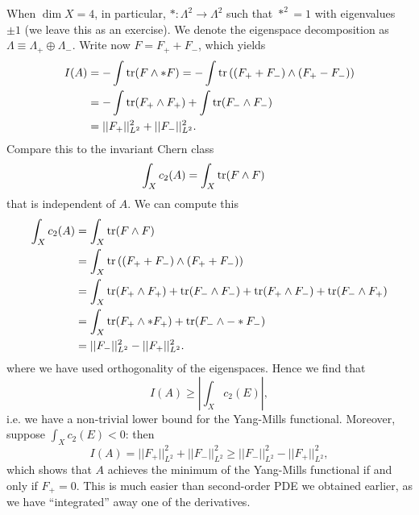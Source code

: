 \documentclass{../mathnotes}
\begin{document}
When $\dim X=4$, in particular, $*:\Lambda^2\to\Lambda^2$ such that $*^2=1$ with eigenvalues $\pm 1$
(we leave this as an exercise). We denote the eigenspace decomposition as $\Lambda\equiv\Lambda_+\oplus\Lambda_-$.
Write now $F=F_++F_-$, which yields
\begin{align*}
    I(A)&=-\int\operatorname{tr}(F\wedge *F)=-\int\operatorname{tr}\left( (F_++F_-)\wedge (F_+-F_-) \right)\\
    &=-\int\operatorname{tr}(F_+\wedge F_+)+\int\operatorname{tr}(F_-\wedge F_-)\\
    &=||F_+||^2_{L^2}+||F_-||^2_{L^2}.
\end{align*}
Compare this to the invariant Chern class
\begin{align*}
    \int_Xc_2(A)&=\int_X\operatorname{tr}(F\wedge F)
\end{align*}
that is independent of $A$. We can compute this
\begin{align*}
    \int_Xc_2(A)&=\int_X\operatorname{tr}(F\wedge F)\\
    &=\int_X\operatorname{tr}\left( (F_++F_-)\wedge(F_++F_-) \right)\\
    &=\int_X \operatorname{tr}(F_+\wedge F_+)+\operatorname{tr}(F_-\wedge F_-)+\operatorname{tr}(F_+\wedge F_-)+\operatorname{tr}(F_-\wedge F_+)\\
    &=\int_X \operatorname{tr}(F_+\wedge *F_+)+\operatorname{tr}(F_-\wedge -*F_-)\\
    &=||F_-||^2_{L^2}-||F_+||^2_{L^2}.
\end{align*}
where we have used orthogonality of the eigenspaces. Hence we find that
\[I(A)\geq |\int_Xc_2(E)|,\]
i.e. we have a non-trivial lower bound for the Yang-Mills functional. Moreover, suppose $\int_X c_2(E)<0$: then
\[I(A)=||F_+||^2_{L^2}+||F_-||^2_{L^2}\geq ||F_-||^2_{L^2}-||F_+||^2_{L^2},\]
which shows that $A$ achieves the minimum of the Yang-Mills functional if and only if $F_+=0$.
This is much easier than second-order PDE we obtained earlier, as we have ``integrated'' away
one of the derivatives.
\end{document}
